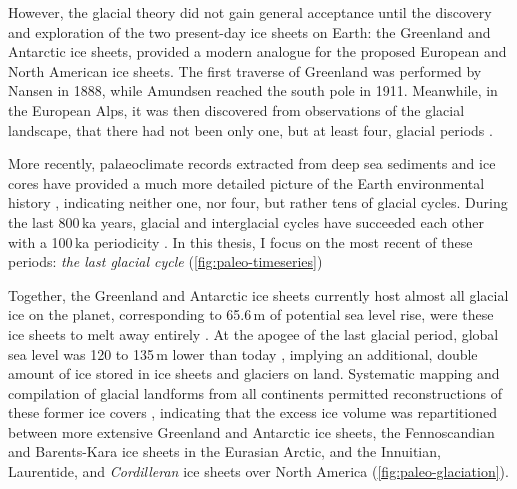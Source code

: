 \documentclass{article}
\begin{document}
However, the glacial theory did not gain general acceptance until the
discovery and exploration
of the two present-day ice sheets on Earth: the Greenland and
Antarctic ice sheets, provided a modern analogue for the proposed European and
North American ice sheets. The first traverse of Greenland was performed by
Nansen in 1888, while Amundsen reached the south pole in 1911. Meanwhile, in
the European Alps, it was then discovered from observations of the glacial
landscape, that there had not been only one, but at least four, glacial periods
\citep{Penck.Bruckner.1909}.

More recently, palaeoclimate records extracted from deep sea sediments and ice
cores have provided a much more detailed picture of the Earth environmental
history \citep[e.g.,][]{Emiliani.1955, Shackleton.Opdyke.1973,
Dansgaard.etal.1993}, indicating neither one, nor four, but rather tens of
glacial cycles. During the last 800\,ka years, glacial and interglacial cycles
have succeeded each other with a 100\,ka periodicity \citep{Hays.etal.1976,
Augustin.etal.2004}. In this thesis, I focus on the most recent of these
periods: \emph{the last glacial cycle} (\cref{fig:paleo-timeseries})

Together, the Greenland and Antarctic ice sheets currently host almost all
glacial ice on the planet, corresponding to 65.6\,m of potential sea level
rise, were these ice sheets to melt away entirely \citep{Bamber.etal.2013,
Fretwell.etal.2013}. At the apogee of the last glacial period, global sea level
was 120 to 135\,m lower than today
\citep{Clark.Mix.2002}, implying an additional, double amount of ice stored in
ice sheets and glaciers on land. Systematic mapping and compilation of glacial
landforms from all continents \citep[e.g.,][]{Prest.etal.1968,
Boulton.Clark.1990, Kleman.etal.1997, Hattestrand.1998} permitted
reconstructions of these former ice covers \citep{Ehlers.Gibbard.2007},
indicating that the excess ice volume
was repartitioned between more extensive Greenland and Antarctic ice sheets,
the Fennoscandian and Barents-Kara ice sheets in the Eurasian Arctic, and the
Innuitian, Laurentide, and \emph{Cordilleran} ice
sheets over North America (\cref{fig:paleo-glaciation}).
\end{document}
